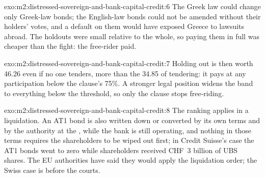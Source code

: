 \begin{solution}{exo:m2:distressed-sovereign-and-bank-capital-credit:6}
The Greek law could change only Greek-law bonds; the English-law bonds could not be
amended without their holders' votes, and a default on them would have exposed Greece
to lawsuits abroad. The holdouts were small relative to the whole, so paying them in
full was cheaper than the fight: the free-rider paid.
\end{solution}

\begin{solution}{exo:m2:distressed-sovereign-and-bank-capital-credit:7}
Holding out is then worth 46.26 even if no one tenders, more than the 34.85 of
tendering: it pays at any participation below the clause's 75\%. A stronger legal
position widens the band to everything below the threshold, so only the clause stops
free-riding.
\end{solution}

\begin{solution}{exo:m2:distressed-sovereign-and-bank-capital-credit:8}
The ranking applies in a liquidation. An AT1 bond is also written down or converted by
its own terms and by the authority at the , while the bank is
still operating, and nothing in those terms requires the shareholders to be wiped out
first; in Credit Suisse's case the AT1 bonds went to zero while shareholders received
CHF~3 billion of UBS shares. The EU authorities have said they would apply the
liquidation order; the Swiss case is before the courts.
\end{solution}

